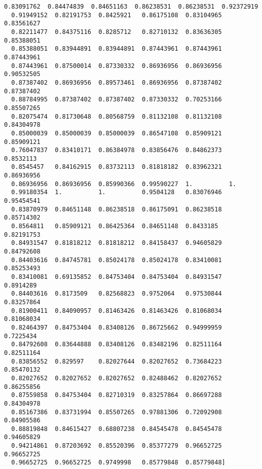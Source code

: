 \documentclass[11pt]{article}
\begin{document}
\begin{Verbatim}[commandchars=\\\{\}]
  0.83091762  0.84474839  0.84651163  0.86238531  0.86238531  0.92372919
  0.91949152  0.82191753  0.8425921   0.86175108  0.83104965  0.83561627
  0.82211477  0.84375116  0.8285712   0.82710132  0.83636305  0.85388051
  0.85388051  0.83944891  0.83944891  0.87443961  0.87443961  0.87443961
  0.87443961  0.87500014  0.87330332  0.86936956  0.86936956  0.90532505
  0.87387402  0.86936956  0.89573461  0.86936956  0.87387402  0.87387402
  0.88784995  0.87387402  0.87387402  0.87330332  0.70253166  0.85507265
  0.82075474  0.81730648  0.80568759  0.81132108  0.81132108  0.84304978
  0.85000039  0.85000039  0.85000039  0.86547108  0.85909121  0.85909121
  0.76047837  0.83410171  0.86384978  0.83856476  0.84862373  0.8532113
  0.8545457   0.84162915  0.83732113  0.81818182  0.83962321  0.86936956
  0.86936956  0.86936956  0.85990366  0.99590227  1.          1.
  0.99180354  1.          1.          0.9504128   0.83076946  0.95454541
  0.83870979  0.84651148  0.86238518  0.86175091  0.86238518  0.85714302
  0.8564811   0.85909121  0.86425364  0.84651148  0.8433185   0.82191753
  0.84931547  0.81818212  0.81818212  0.84158437  0.94605829  0.84792608
  0.84403616  0.84745781  0.85024178  0.85024178  0.83410081  0.85253493
  0.83410081  0.69135852  0.84753404  0.84753404  0.84931547  0.8914289
  0.84403616  0.8173509   0.82568823  0.9752064   0.97530844  0.83257864
  0.81900411  0.84090957  0.81463426  0.81463426  0.81068034  0.81068034
  0.82464397  0.84753404  0.83408126  0.86725662  0.94999959  0.7225434
  0.84792608  0.83644888  0.83408126  0.83482196  0.82511164  0.82511164
  0.83856552  0.829597    0.82027644  0.82027652  0.73684223  0.85470132
  0.82027652  0.82027652  0.82027652  0.82488462  0.82027652  0.86255856
  0.87559858  0.84753404  0.82710319  0.83257864  0.86697288  0.84304978
  0.85167386  0.83731994  0.85507265  0.97881306  0.72092908  0.84905586
  0.88819848  0.84615427  0.68807238  0.84545478  0.84545478  0.94605829
  0.94214861  0.87203692  0.85520396  0.85377279  0.96652725  0.96652725
  0.96652725  0.96652725  0.9749998   0.85779848  0.85779848]

\end{Verbatim}
\end{document}
